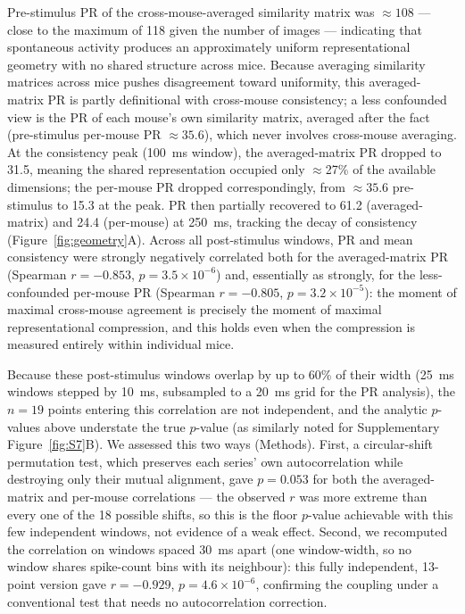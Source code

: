 \documentclass[11pt,onecolumn]{article}
\begin{document}
Pre-stimulus PR of the cross-mouse-averaged similarity matrix was
$\approx 108$ --- close to the maximum of 118 given the number of
images --- indicating that spontaneous activity produces an
approximately uniform representational geometry with no shared structure
across mice.  Because averaging similarity matrices across mice pushes
disagreement toward uniformity, this averaged-matrix PR is partly
definitional with cross-mouse consistency; a less confounded view is
the PR of each mouse's own similarity matrix, averaged after the fact
(pre-stimulus per-mouse PR $\approx 35.6$), which never involves
cross-mouse averaging.  At the consistency peak (100~ms window), the
averaged-matrix PR dropped to 31.5, meaning the shared representation
occupied only $\approx$27\% of the available dimensions; the per-mouse
PR dropped correspondingly, from $\approx 35.6$ pre-stimulus to 15.3 at
the peak.  PR then partially recovered to 61.2 (averaged-matrix) and
24.4 (per-mouse) at 250~ms, tracking the decay of consistency
(Figure~\ref{fig:geometry}A).  Across all post-stimulus windows, PR and
mean consistency were strongly negatively correlated both for the
averaged-matrix PR (Spearman $r = -0.853$, $p = 3.5 \times 10^{-6}$) and,
essentially as strongly, for the less-confounded per-mouse PR
(Spearman $r = -0.805$, $p = 3.2 \times 10^{-5}$): the moment of maximal
cross-mouse agreement is precisely the moment of maximal representational
compression, and this holds even when the compression is measured
entirely within individual mice.

Because these post-stimulus windows overlap by up to 60\% of their width
(25~ms windows stepped by 10~ms, subsampled to a 20~ms grid for the PR
analysis), the $n = 19$ points entering this correlation are not
independent, and the analytic $p$-values above understate the true
$p$-value (as similarly noted for Supplementary Figure~\ref{fig:S7}B).
We assessed this two ways (Methods).  First, a circular-shift permutation
test, which preserves each series' own autocorrelation while destroying
only their mutual alignment, gave $p = 0.053$ for both the
averaged-matrix and per-mouse correlations --- the observed $r$ was more
extreme than every one of the 18 possible shifts, so this is the floor
$p$-value achievable with this few independent windows, not evidence of a
weak effect.  Second, we recomputed the correlation on windows spaced
30~ms apart (one window-width, so no window shares spike-count bins with
its neighbour): this fully independent, 13-point version gave
$r = -0.929$, $p = 4.6 \times 10^{-6}$, confirming the coupling under a
conventional test that needs no autocorrelation correction.
\end{document}
